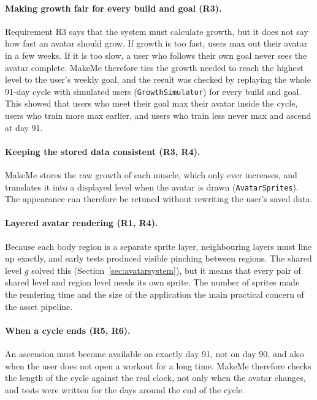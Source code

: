 \documentclass[11pt]{article}
\begin{document}
\paragraph{Making growth fair for every build and goal (R3).}
Requirement R3 says that the system must calculate growth, but it does not say how fast an avatar should grow. If growth is too fast, users max out their avatar in a few weeks. If it is too slow, a user who follows their own goal never sees the avatar complete. MakeMe therefore ties the growth needed to reach the highest level to the user's weekly goal, and the result was checked by replaying the whole 91-day cycle with simulated users (\texttt{GrowthSimulator}) for every build and goal. This showed that users who meet their goal max their avatar inside the cycle, users who train more max earlier, and users who train less never max and ascend at day 91.

\paragraph{Keeping the stored data consistent (R3, R4).}
MakeMe stores the raw growth of each muscle, which only ever increases, and translates it into a displayed level when the avatar is drawn (\texttt{AvatarSprites}). The appearance can therefore be retuned without rewriting the user's saved data.

\paragraph{Layered avatar rendering (R1, R4).}
Because each body region is a separate sprite layer, neighbouring layers must line up exactly, and early tests produced visible pinching between regions. The shared level $g$ solved this (Section~\ref{sec:avatarsystem}), but it means that every pair of shared level and region level needs its own sprite. The number of sprites made the rendering time and the size of the application the main practical concern of the asset pipeline.

\paragraph{When a cycle ends (R5, R6).}
An ascension must become available on exactly day 91, not on day 90, and also when the user does not open a workout for a long time. MakeMe therefore checks the length of the cycle against the real clock, not only when the avatar changes, and tests were written for the days around the end of the cycle.
\end{document}
